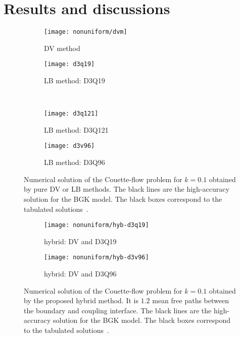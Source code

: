 \documentclass[]{elsarticle} %
\begin{document}
\section{Results and discussions}\label{sec:results}

\begin{figure}
    \centering
    \begin{subfigure}[b]{0.5\textwidth}
        \texttt{[image: nonuniform/dvm]}
        \caption{DV method}
        \label{fig:dvm}
    \end{subfigure}%
    \begin{subfigure}[b]{0.5\textwidth}
        \texttt{[image: d3q19]}
        \caption{LB method: D3Q19}
        \label{fig:d3q19}
    \end{subfigure}\\
    \begin{subfigure}[b]{0.5\textwidth}
        \texttt{[image: d3q121]}
        \caption{LB method: D3Q121}
        \label{fig:d3q121}
    \end{subfigure}%
    \begin{subfigure}[b]{0.5\textwidth}
        \texttt{[image: d3v96]}
        \caption{LB method: D3Q96}
        \label{fig:d3q96}
    \end{subfigure}
    \caption{
        Numerical solution of the Couette-flow problem for \(k=0.1\) obtained by pure DV or LB methods.
        The black lines are the high-accuracy solution for the BGK model.
        The black boxes correspond to the tabulated solutions~\cite{Luo2016}.
    }\label{fig:pure}
\end{figure}

\begin{figure}
    \centering
    \begin{subfigure}[b]{0.5\textwidth}
        \texttt{[image: nonuniform/hyb-d3q19]}
        \caption{hybrid: DV and D3Q19}
        \label{fig:hyb:d3q19}
    \end{subfigure}%
    \begin{subfigure}[b]{0.5\textwidth}
        \texttt{[image: nonuniform/hyb-d3v96]}
        \caption{hybrid: DV and D3Q96}
        \label{fig:hyb:d3v96}
    \end{subfigure}
    \caption{
        Numerical solution of the Couette-flow problem for \(k=0.1\) obtained by the proposed hybrid method.
        It is \(1.2\) mean free paths between the boundary and coupling interface.
        The black lines are the high-accuracy solution for the BGK model.
        The black boxes correspond to the tabulated solutions~\cite{Luo2016}.
    }\label{fig:hybrid}
\end{figure}
\end{document}
